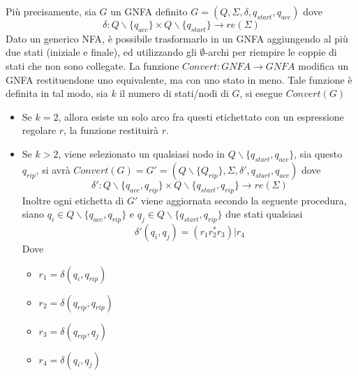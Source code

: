 \documentclass[10pt, letterpaper]{report}
\begin{document}
Più precisamente, sia $G$ un GNFA definito $G=(Q,\Sigma,\delta,q_{start},q_{acc})$ dove 
$$ \delta : Q\backslash \{q_{acc}\} \times Q\backslash \{q_{start}\}\rightarrow re(\Sigma)$$
Dato un generico NFA, è possibile trasformarlo in un GNFA aggiungendo al più due stati (iniziale e 
finale), ed utilizzando gli $\emptyset$-archi per riempire le coppie di stati che non sono collegate.\acc 
La funzione $Convert : GNFA \rightarrow GNFA$ modifica un GNFA restituendone uno equivalente, ma con uno stato in meno. 
Tale funzione è definita in tal modo, sia $k$ il numero di stati/nodi di $G$, si esegue $Convert(G)$ \begin{itemize}
    \item Se $k=2$, allora esiste un solo arco fra questi etichettato con un espressione regolare $r$, la funzione 
    restituirà $r$. 
    \item Se $k> 2$, viene selezionato un qualsiasi nodo in $Q\backslash\{q_{start},q_{acc}\}$, sia questo $q_{rip}$, 
    si avrà $Convert(G)=G'=(Q\backslash\{Q_{rip}\},\Sigma,\delta',q_{start},q_{acc})$ dove 
    $$ \delta' : Q\backslash \{q_{acc},q_{rip}\} \times Q\backslash \{q_{start},q_{rip}\}\rightarrow re(\Sigma)$$
    Inoltre ogni etichetta di $G'$ viene aggiornata secondo la seguente procedura, siano $q_i\in Q\backslash \{q_{acc},q_{rip}\}$
    e  $q_j\in Q\backslash \{q_{start},q_{rip}\}$ due stati qualsiasi 
    $$ \delta'(q_i,q_j)=(r_1r_2^*r_3)|r_4$$
    Dove \begin{itemize}
        \item $r_1=\delta(q_i,q_{rip})$
        \item $r_2=\delta(q_{rip},q_{rip})$
        \item $r_3=\delta(q_{rip},q_j)$
        \item $r_4=\delta(q_i,q_j)$
    \end{itemize}
\end{itemize}
\begin{figure}[h!]
    \centering
\end{figure}
\end{document}
